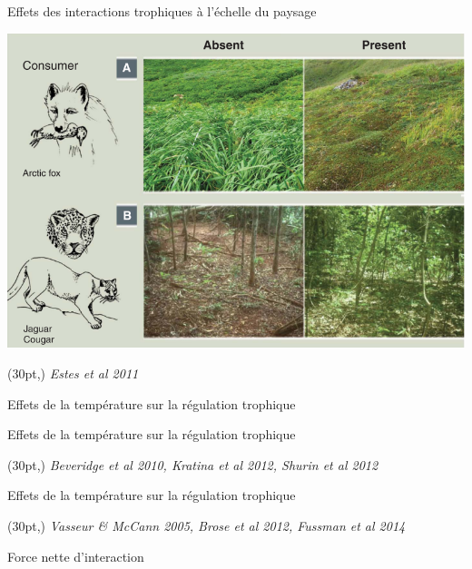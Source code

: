 \documentclass[11pt, compress, aspectratio=1610]{beamer}
\newcommand\smallcitation[1]{%
\begin{textblock*}{\textwidth}(30pt,\textheight)
    \raggedleft \small\textit{#1}
\end{textblock*}}
\begin{document}
\begin{frame}{Effets des interactions trophiques à l'échelle du paysage}

\centering
 \includegraphics[width=0.7\linewidth]{figuresAz/estes2011.png}\par
\smallcitation{Estes \textit{et al} 2011}

\end{frame}

\begin{frame}{Effets de la température sur la régulation trophique}

\centering
 \par

\end{frame}

\begin{frame}{Effets de la température sur la régulation trophique}

\centering
\par
\smallcitation{Beveridge et al 2010, Kratina et al 2012, Shurin et al 2012}

\end{frame}

\begin{frame}{Effets de la température sur la régulation trophique}

\par
\smallcitation{Vasseur \& McCann 2005, Brose et al 2012, Fussman et al 2014}

\end{frame}

\begin{frame}{Force nette d'interaction}

\centering
\par

\end{frame}
\end{document}
